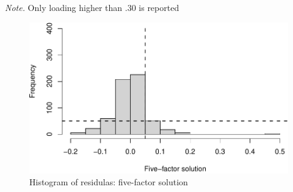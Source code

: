 \documentclass[
  english,
  man]{apa6}
\begin{document}
\begin{table}[tbp]
\begin{center}
\begin{threeparttable}
{}

\begin{tablenotes}[para]
\normalsize{\textit{Note.} Only loading higher than .30 is reported}
\end{tablenotes}

\end{threeparttable}
\end{center}

\end{table}

\begin{figure}

{\centering \includegraphics[width=0.5\linewidth,height=0.5\textheight]{manuscript_files/figure-latex/EFAResiduals-1} 

}

\caption{ Histogram of residulas:  five-factor solution}\label{fig:EFAResiduals}
\end{figure}
\end{document}
